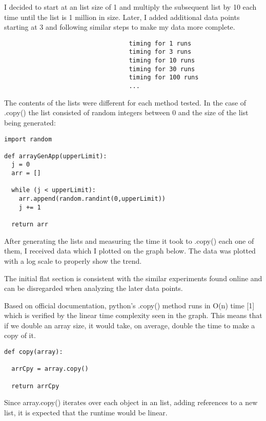 \documentclass[12pt]{article}
\begin{document}
I decided to start at an list size of 1 and multiply the subsequent list by 10 each time until the list is 1 million in size. Later, I  added additional data points starting at 3 and following similar steps to make my data more complete. 

\footnotesize
\begin{verbatim}
                                  timing for 1 runs
                                  timing for 3 runs
                                  timing for 10 runs
                                  timing for 30 runs
                                  timing for 100 runs
                                  ...
\end{verbatim}
\normalsize
  
The contents of the lists were different for each method tested. In the case of .copy() the list consisted of random integers between 0 and the size of the list being generated:

\footnotesize
\begin{verbatim}
import random

def arrayGenApp(upperLimit):
  j = 0
  arr = []

  while (j < upperLimit):
    arr.append(random.randint(0,upperLimit))
    j += 1

  return arr
\end{verbatim}
\normalsize

After generating the lists and measuring the time it took to .copy() each one of them, I received data which I plotted on the graph below. The data was plotted with a log scale to properly show the trend.

The initial flat section is consistent with the similar experiments found online and can be disregarded when analyzing the later data points. 



Based on official documentation, python's .copy() method runs in O(n) time [1] which is verified by the linear time complexity seen in the graph. This means that if we double an array size, it would take, on average, double the time to make a copy of it. 

\footnotesize
\begin{verbatim}
def copy(array):

  arrCpy = array.copy()

  return arrCpy
\end{verbatim}
\normalsize

Since array.copy() iterates over each object in an list, adding references to a new list, it is expected that the runtime would be linear.
\end{document}
